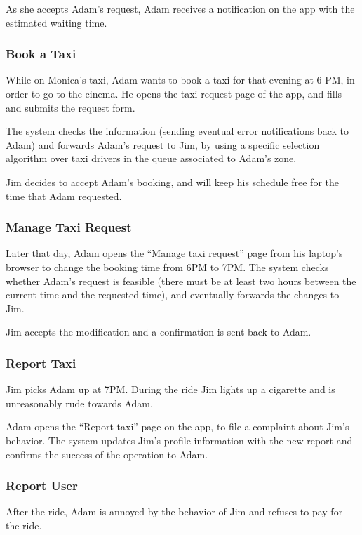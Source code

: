 \documentclass[english]{article}
\begin{document}
As she accepts Adam's request, Adam receives a notification on the
app with the estimated waiting time. 


\subsubsection{Book a Taxi}

While on Monica's taxi, Adam wants to book a taxi for that evening
at 6 PM, in order to go to the cinema. He opens the taxi request page
of the app, and fills and submits the request form. 

The system checks the information (sending eventual error notifications
back to Adam) and forwards Adam's request to Jim, by using a specific
selection algorithm over taxi drivers in the queue associated to Adam's
zone. 

Jim decides to accept Adam's booking, and will keep his schedule free
for the time that Adam requested. 


\subsubsection{Manage Taxi Request}

Later that day, Adam opens the ``Manage taxi request'' page from
his laptop's browser to change the booking time from 6PM to 7PM. The
system checks whether Adam's request is feasible (there must be at
least two hours between the current time and the requested time),
and eventually forwards the changes to Jim. 

Jim accepts the modification and a confirmation is sent back to Adam. 


\subsubsection{Report Taxi}

Jim picks Adam up at 7PM. During the ride Jim lights up a cigarette
and is unreasonably rude towards Adam.

Adam opens the ``Report taxi'' page on the app, to file a complaint
about Jim's behavior. The system updates Jim's profile information
with the new report and confirms the success of the operation to Adam.


\subsubsection{Report User}

After the ride, Adam is annoyed by the behavior of Jim and refuses
to pay for the ride. 
\end{document}
